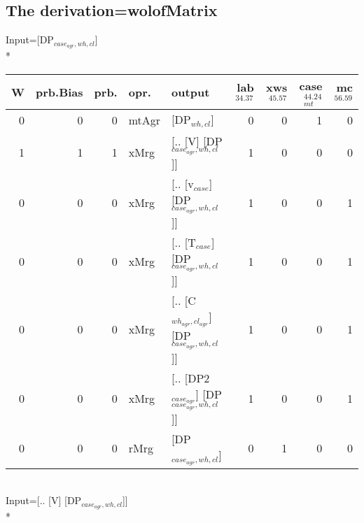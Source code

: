 \subsection{The derivation=wolofMatrix}
\begingroup\scriptsize Input=[DP$_{case_{agr},wh,cl}$]\\*
\begin{tabularx}{\linewidth}{rrrlXrrrr}
\hline
   W &   prb.Bias &   prb. & opr.    & output                                     &   lab$^{34.37}$ &   xws$^{45.57}$ &   case$_{mt}^{44.24}$ &   mc$^{56.59}$ \\
\hline
   0 &       0 &   0 & mtAgr & [DP$_{wh,cl}$]                                 &             0 &             0 &                 1 &            0 \\
   1 &       1 &   1 & xMrg  & [.. [V] [DP$_{case_{agr},wh,cl}$]]               &             1 &             0 &                 0 &            0 \\
   0 &       0 &   0 & xMrg  & [.. [v$_{case}$] [DP$_{case_{agr},wh,cl}$]]          &             1 &             0 &                 0 &            1 \\
   0 &       0 &   0 & xMrg  & [.. [T$_{case}$] [DP$_{case_{agr},wh,cl}$]]          &             1 &             0 &                 0 &            1 \\
   0 &       0 &   0 & xMrg  & [.. [C$_{wh_{agr},cl_{agr}}$] [DP$_{case_{agr},wh,cl}$]] &             1 &             0 &                 0 &            1 \\
   0 &       0 &   0 & xMrg  & [.. [DP2$_{case_{agr}}$] [DP$_{case_{agr},wh,cl}$]]    &             1 &             0 &                 0 &            1 \\
   0 &       0 &   0 & rMrg  & [DP$_{case_{agr},wh,cl}$]                        &             0 &             1 &                 0 &            0 \\
\hline
\end{tabularx}\endgroup\\
\begingroup\scriptsize Input=[.. [V] [DP$_{case_{agr},wh,cl}$]]\\*
